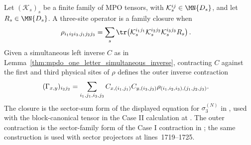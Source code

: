 \begin{definition}
    \label{def:mpdo_three_site_family_closure}
    \leanok
    Let $(\mathcal K_s)_s$ be a finite family of MPO tensors, with
    $\mathcal K_s^{ij}\in\MN{D_s}$, and let $R_s\in\MN{D_s}$.
    A three-site operator is a family closure when
    \begin{align}
        \rho_{i_1i_2i_3,j_1j_2j_3}
         & =\sum_s\tr\!\left(\mathcal K_s^{i_1j_1}\mathcal K_s^{i_2j_2}
        \mathcal K_s^{i_3j_3}R_s\right).
        \notag
    \end{align}
    Given a simultaneous left inverse $C$ as in
    Lemma~\ref{thm:mpdo_one_letter_simultaneous_inverse}, contracting $C$
    against the first and third physical sites of $\rho$ defines the outer
    inverse contraction
    \begin{align}
        (\Gamma_{x,y})_{i_2j_2}
         & =\sum_{i_1,j_1,i_3,j_3}
        C_{x,(i_1,j_1)}C_{y,(i_3,j_3)}
        \rho_{(i_1,i_2,i_3),(j_1,j_2,j_3)}.
        \notag
    \end{align}
    The closure is the sector-sum form of the displayed equation for
    $\sigma_3^{(N)}$ in
    \cite[Appendix~C.2, lines~1343--1348]{Cirac2016MPDO_arXiv}, used with the
    block-canonical tensor in the Case II calculation at
    \cite[Appendix~C.2, lines~1726--1732]{Cirac2016MPDO_arXiv}. The outer
    contraction is the sector-family form of the Case I contraction in
    \cite[Appendix~C.2, lines~1415--1438]{Cirac2016MPDO_arXiv}; the same
    construction is used with sector projectors at lines~1719--1725.
\end{definition}

